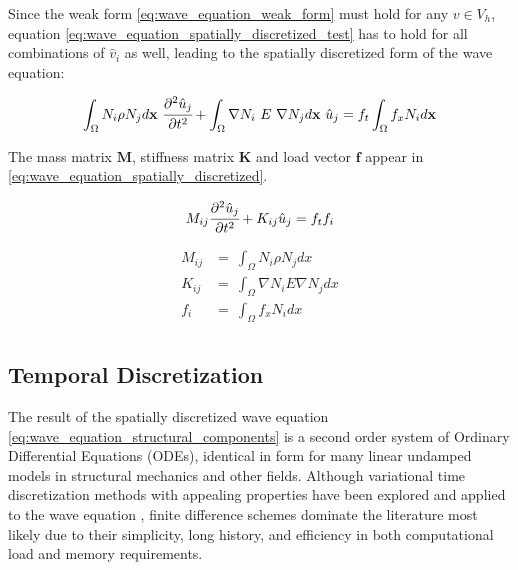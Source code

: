 Since the weak form \ref{eq:wave_equation_weak_form} must hold for any $v \in V_h$, equation \ref{eq:wave_equation_spatially_discretized_test} has to hold for all combinations of $\hat v_i$ as well, leading to the spatially discretized form of the wave equation:

\begin{equation} \label{eq:wave_equation_spatially_discretized}
	\int_{\Omega} N_i \rho N_j d \mathbf x \ \cfrac{\partial^2 \hat u_j}{\partial t^2}
	+
	\int_{\Omega} \nabla N_i \ E \ \nabla N_j d \mathbf x \ \hat u_j
	=
	f_t \int_{\Omega} f_x N_i d \mathbf x
\end{equation}

The mass matrix $\mathbf M$, stiffness matrix $\mathbf K$ and load vector $\mathbf f$ appear in \ref{eq:wave_equation_spatially_discretized}.

\begin{equation} \label{eq:wave_equation_structural_components}
M_{ij} \cfrac{\partial^2 \hat u_j}{\partial t^2}
+
K_{ij} \hat u_j
=
f_t f_i
\end{equation}

\begin{equation} \label{eq:structural_components}
	\begin{array}{rl}
		M_{ij} &= \ \int_{\Omega} N_i \rho N_j dx \\
		K_{ij} &= \ \int_{\Omega} \nabla N_i E \nabla N_j dx \\
		f_{i}  &= \ \int_{\Omega} f_x N_i dx \\
	\end{array}
\end{equation}

\subsection*{Temporal Discretization}
\label{subsection:wave_equation_temporal_discretization}

The result of the spatially discretized wave equation \ref{eq:wave_equation_structural_components} is a second order system of Ordinary Differential Equations (ODEs), identical in form for many linear undamped models in structural mechanics and other fields. Although variational time discretization methods with appealing properties have been explored \cite{Zhao2014} and applied to the wave equation \cite{Kocher2014}, finite difference schemes dominate the literature most likely due to their simplicity, long history, and efficiency in both computational load and memory requirements.

